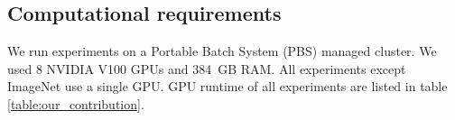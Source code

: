 


\subsection{Computational requirements}
We run experiments on a Portable Batch System (PBS) managed cluster. We used 8 NVIDIA V100 GPUs and 384\ GB RAM. All experiments except ImageNet use a single GPU. GPU runtime of all experiments are listed in table \ref{table:our_contribution}.


